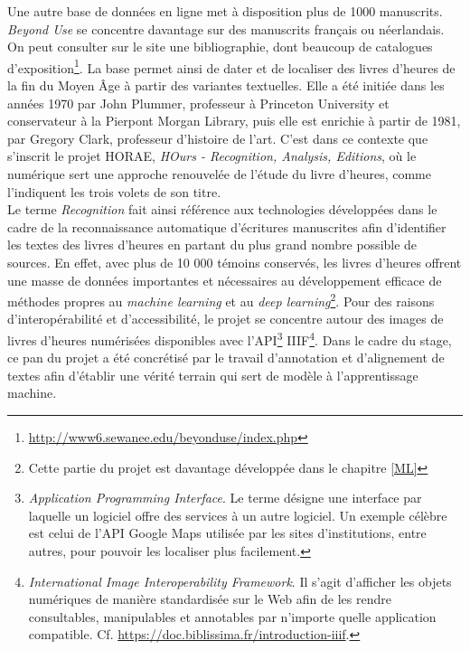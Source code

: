 \documentclass[a4paper,12pt,twoside]{book}
\begin{document}
Une autre base de données en ligne met à disposition plus de 1000 manuscrits. \textit{Beyond Use} se concentre davantage sur des manuscrits français ou néerlandais. On peut consulter sur le site une bibliographie, dont beaucoup de catalogues d'exposition\footnote{\url{http://www6.sewanee.edu/beyonduse/index.php}}. La base permet ainsi de dater et de localiser des livres d’heures de la fin du Moyen Âge à partir des variantes textuelles. Elle a été initiée dans les années 1970 par John Plummer, professeur à Princeton University et conservateur à la Pierpont Morgan Library, puis elle est enrichie à partir de 1981, par Gregory Clark, professeur d'histoire de l'art. C'est dans ce contexte que s'inscrit le projet HORAE, \textit{HOurs - Recognition, Analysis, Editions}, où le numérique sert une approche renouvelée de l'étude du livre d'heures, comme l'indiquent les trois volets de son titre.  \\

Le terme \textit{Recognition} fait ainsi référence aux technologies développées dans le cadre de la reconnaissance automatique d'écritures manuscrites afin d'identifier les textes des livres d'heures en partant du plus grand nombre possible de sources. En effet, avec plus de 10 000 témoins conservés, les livres d'heures offrent une masse de données importantes et nécessaires au développement efficace de méthodes propres au \textit{machine learning} et au \textit{deep learning}\footnote{Cette partie du projet est davantage développée dans le chapitre \ref{ML}}. Pour des raisons d'interopérabilité et d'accessibilité, le projet se concentre autour des images de livres d'heures numérisées disponibles avec l'API\footnote{\textit{Application Programming Interface}. Le terme désigne une interface par laquelle un logiciel offre des services à un autre logiciel. Un exemple célèbre est celui de l'API Google Maps utilisée par les sites d'institutions, entre autres, pour pouvoir les localiser plus facilement.} IIIF\footnote{\textit{International Image Interoperability Framework}. Il s'agit d'afficher les objets numériques de manière standardisée sur le Web afin de les rendre consultables, manipulables et annotables par n'importe quelle application compatible. Cf. \url{https://doc.biblissima.fr/introduction-iiif}.}. Dans le cadre du stage, ce pan du projet a été concrétisé par le travail d'annotation et d'alignement de textes afin d'établir une vérité terrain qui sert de modèle à l'apprentissage machine. 
\end{document}
